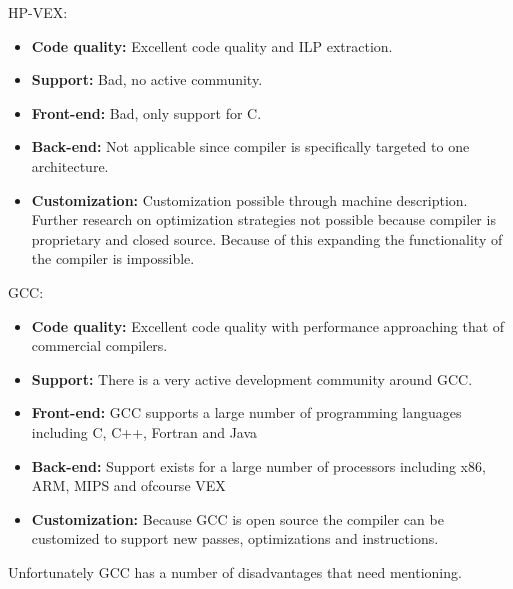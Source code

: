 HP-VEX:
\begin{itemize}
	\item \textbf{Code quality:} Excellent code quality and ILP extraction.
	\item \textbf{Support:} Bad, no active community.
	\item \textbf{Front-end:} Bad, only support for C.
	\item \textbf{Back-end:} Not applicable since compiler is specifically targeted to one architecture.
	\item \textbf{Customization:} Customization possible through machine description. Further research on optimization strategies not possible because compiler is proprietary and closed source. Because of this expanding the functionality of the compiler is impossible.
\end{itemize}

GCC:
\begin{itemize}
	\item \textbf{Code quality:} Excellent code quality with performance approaching that of commercial compilers.
	\item \textbf{Support:} There is a very active development community around GCC.
	\item \textbf{Front-end:} GCC supports a large number of programming languages including C, C++, Fortran and Java
	\item \textbf{Back-end:} Support exists for a large number of processors including x86, ARM, MIPS and ofcourse VEX
	\item \textbf{Customization:} Because GCC is open source the compiler can be customized to support new passes, optimizations and instructions.
\end{itemize}

Unfortunately GCC has a number of disadvantages that need mentioning.

